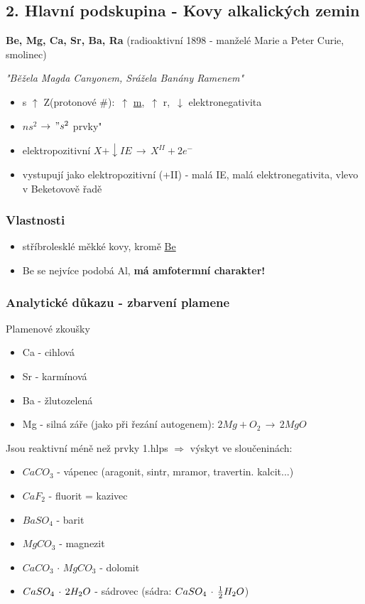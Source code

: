 \newpage
\subsection{2. Hlavní podskupina - Kovy alkalických zemin}
    \textbf{Be, Mg, Ca, Sr, Ba, Ra} (radioaktivní 1898 - manželé Marie a Peter Curie, smolinec)

    \textit{"Běžela Magda Canyonem, Srážela Banány Ramenem"}

    \begin{itemize}
        \item s $\uparrow$ Z(protonové \#): $\,\uparrow$ \underline{m}, $\,\uparrow$ r, $\,\downarrow$ elektronegativita
        \item $ns^2$ \fbox{$\uparrow \downarrow$} $\rightarrow \," s^2$ prvky"
        \item elektropozitivní \(X + \downarrow IE \,\to\,X^{II} + 2e^-\)
        \item vystupují jako elektropozitivní (+II) - malá IE, malá elektronegativita, vlevo v Beketovově řadě
    \end{itemize}

    \subsubsection{Vlastnosti}
        \begin{itemize}
            \item stříbrolesklé měkké kovy, kromě \underline{Be}
            \item Be se nejvíce podobá Al, \textbf{má amfotermní charakter!}
        \end{itemize}

    \subsubsection{Analytické důkazu - zbarvení plamene}
        Plamenové zkoušky
        \begin{itemize}
            \item Ca - cihlová
            \item Sr - karmínová
            \item Ba - žlutozelená
            \item Mg - silná záře (jako při řezání autogenem):  $2Mg + O _2 \,\to\, 2MgO$
        \end{itemize}
    Jsou reaktivní méně než prvky 1.hlps $\Rightarrow$ výskyt ve sloučeninách:
        \begin{itemize}
            \item $CaCO_3$ - vápenec (aragonit, sintr, mramor, travertin. kalcit...)
            \item $CaF_2$ - fluorit = kazivec
            \item $BaSO _4$ - barit
            \item $MgCO_3$ - magnezit
            \item $CaCO_3 \, \cdot \, MgCO_3$ - dolomit
            \item $CaSO_4 \, \cdot \, 2H_2O$ - sádrovec (sádra: $CaSO_4 \,\cdot\, \frac{1}{2}H_2O$)
        \end{itemize}

